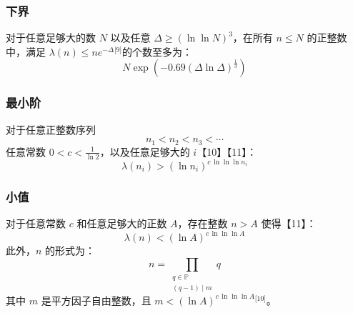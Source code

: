 \subsubsection{下界}
对于任意足够大的数 $N$ 以及任意 $\Delta \ge (\ln \ln N)^{3}$，在所有 $n \le N$ 的正整数中，满足 $\lambda(n) \le n e^{-\Delta}$\(^\text{[9]}\)的个数至多为：
$$
N \exp\left( -0.69 (\Delta \ln \Delta)^{\frac{1}{3}} \right)~
$$
\subsubsection{最小阶}
对于任意正整数序列  
$$
n_{1} < n_{2} < n_{3} < \cdots~
$$
任意常数 $0 < c < \frac{1}{\ln 2}$，以及任意足够大的 $i$【10】【11】：
$$
\lambda(n_{i}) > \left( \ln n_{i} \right)^{c \, \ln \ln \ln n_{i}}~
$$
\subsubsection{小值}
对于任意常数 $c$ 和任意足够大的正数 $A$，存在整数 $n > A$ 使得【11】：
$$
\lambda(n) < \left( \ln A \right)^{c \, \ln \ln \ln A}~
$$
此外，$n$ 的形式为：
$$
n = \prod_{\substack{q \in \mathbb{P} \\ (q - 1) \mid m}} q~
$$
其中 $m$ 是平方因子自由整数，且 $m < (\ln A)^{c \, \ln \ln \ln A}$\(^\text{[10]}\)。
